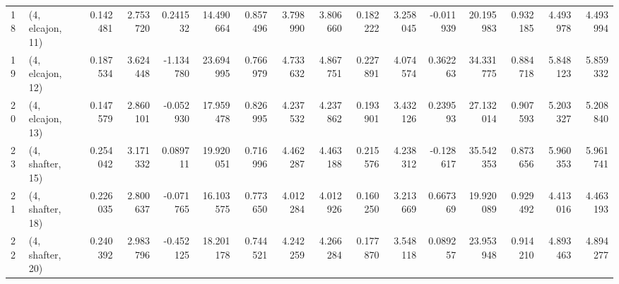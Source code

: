 \begin{tabular}{llrrrrrrrrrrrrrr}
18 &  (4, elcajon, 11) &   0.142481 &  2.753720 &  0.241532 &  14.490664 &  0.857496 &   3.798990 &  3.806660 &  0.182222 &   3.258045 & -0.011939 &   20.195983 &  0.932185 &   4.493978 &   4.493994 \\
19 &  (4, elcajon, 12) &   0.187534 &  3.624448 & -1.134780 &  23.694995 &  0.766979 &   4.733632 &  4.867751 &  0.227891 &   4.074574 &  0.362263 &   34.331775 &  0.884718 &   5.848123 &   5.859332 \\
20 &  (4, elcajon, 13) &   0.147579 &  2.860101 & -0.052930 &  17.959478 &  0.826995 &   4.237532 &  4.237862 &  0.193901 &   3.432126 &  0.239593 &   27.132014 &  0.907593 &   5.203327 &   5.208840 \\
23 &  (4, shafter, 15) &   0.254042 &  3.171332 &  0.089711 &  19.920051 &  0.716996 &   4.462287 &  4.463188 &  0.215576 &   4.238312 & -0.128617 &   35.542353 &  0.873656 &   5.960353 &   5.961741 \\
21 &  (4, shafter, 18) &   0.226035 &  2.800637 & -0.071765 &  16.103575 &  0.773650 &   4.012284 &  4.012926 &  0.160250 &   3.213669 &  0.667369 &   19.920089 &  0.929492 &   4.413016 &   4.463193 \\
22 &  (4, shafter, 20) &   0.240392 &  2.983796 & -0.452125 &  18.201178 &  0.744521 &   4.242259 &  4.266284 &  0.177870 &   3.548118 &  0.089257 &   23.953948 &  0.914210 &   4.893463 &   4.894277 \\
\bottomrule
\end{tabular}
